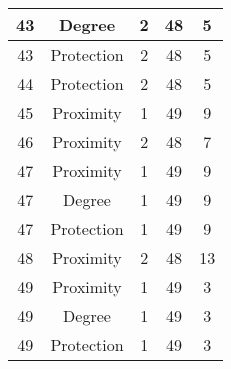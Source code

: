 \documentclass[results.tex]{subfiles}
\begin{document}
\begin{center}
\begin{tabular}{| c || c | c | c | c |}
            \hline
            43                      & Degree                       & 2                      & 48                      & 5                    \\
            \hline
            43                      & Protection                   & 2                      & 48                      & 5                    \\
            \hline
            44                      & Protection                   & 2                      & 48                      & 5                    \\
            \hline
            45                      & Proximity                    & 1                      & 49                      & 9                    \\
            \hline
            46                      & Proximity                    & 2                      & 48                      & 7                    \\
            \hline
            47                      & Proximity                    & 1                      & 49                      & 9                    \\
            \hline
            47                      & Degree                       & 1                      & 49                      & 9                    \\
            \hline
            47                      & Protection                   & 1                      & 49                      & 9                    \\
            \hline
            48                      & Proximity                    & 2                      & 48                      & 13                   \\
            \hline
            49                      & Proximity                    & 1                      & 49                      & 3                    \\
            \hline
            49                      & Degree                       & 1                      & 49                      & 3                    \\
            \hline
            49                      & Protection                   & 1                      & 49                      & 3                    \\
            \hline
        \end{tabular}
    \end{center}
\end{document}
